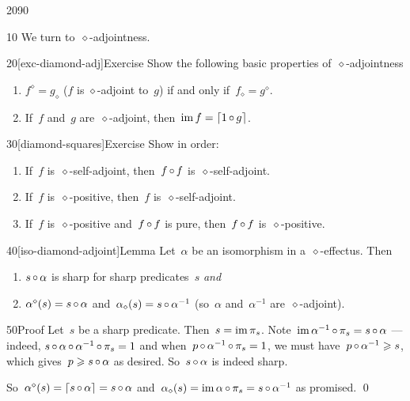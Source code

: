 \begin{parsec}{2090}%
\begin{point}{10}%
We turn to~$\diamond$-adjointness.
\end{point}
\begin{point}{20}[exc-diamond-adj]{Exercise}%
Show the following basic properties of~$\diamond$-adjointness
\begin{enumerate}
    \item
$f^\diamond = g_\diamond$
    ($f$ is $\diamond$-adjoint to~$g$)
    if and only if~$f_\diamond = g^\diamond$.
    \item
If~$f$ and~$g$ are~$\diamond$-adjoint,
    then~$\operatorname{im} f = \left\lceil1 \mathop{\circ} g\right\rceil$.
\end{enumerate}
\end{point}
\spacingfix{}
\begin{point}{30}[diamond-squares]{Exercise}%
Show in order:
\begin{enumerate}
\item
If~$f$ is~$\diamond$-self-adjoint,
    then~$f \mathop{\circ} f$ is~$\diamond$-self-adjoint.
\item
If~$f$ is~$\diamond$-positive,
    then~$f$ is~$\diamond$-self-adjoint.
\item
If~$f$ is~$\diamond$-positive and~$f\mathop{\circ} f$ is pure,
    then~$f \mathop{\circ} f$ is~$\diamond$-positive.
\end{enumerate}
\end{point}
\spacingfix{}
\begin{point}{40}[iso-diamond-adjoint]{Lemma}%
Let~$\alpha$ be an isomorphism in a~$\diamond$-effectus.
Then
\begin{enumerate}
\item
    $s\mathop{\circ}\alpha$ is sharp for sharp predicates~$s$ \emph{and}
\item
    $\alpha^\diamond(s) = s \mathop{\circ} \alpha$
    and~$\alpha_\diamond(s) = s\mathop{\circ} \alpha^{-1}$
    (so~$\alpha$ and~$\alpha^{-1}$ are~$\diamond$-adjoint).
\end{enumerate}
\spacingfix{}
\begin{point}{50}{Proof}%
Let~$s$ be a sharp predicate. Then~$s = \operatorname{im} \pi_s$.
Note~$\operatorname{im} \alpha^{-1}\mathop{\circ} \pi_s = s \mathop{\circ} \alpha$
    --- indeed, $s \mathop{\circ} \alpha \mathop{\circ} \alpha^{-1} \mathop{\circ} \pi_s=1$
    and when~$p \mathop{\circ} \alpha^{-1} \mathop{\circ} \pi_s=1$,
    we must have~$p \mathop{\circ} \alpha^{-1} \geqslant s$,
    which gives~$p \geqslant s \mathop{\circ} \alpha$ as desired.
    So~$s \mathop{\circ} \alpha$ is indeed sharp.

So~$\alpha^\diamond(s) = \left\lceil s \mathop{\circ} \alpha\right\rceil = s\mathop{\circ} \alpha$
    and~$\alpha_\diamond(s) = \operatorname{im} \alpha \mathop{\circ} \pi_s = s \mathop{\circ} \alpha^{-1}$
    as promised. \qed
\end{point}
\end{point}
\end{parsec}

